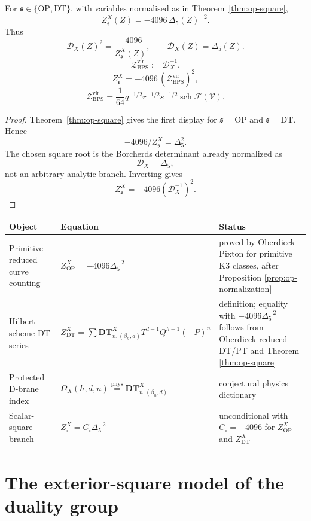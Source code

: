 \documentclass[11pt]{memoir}
\newcommand{\sch}{\operatorname{sch}}
\begin{document}
\begin{theorem}
For \(\mathfrak s\in\{\mathrm{OP},\mathrm{DT}\}\), with variables
normalised as in Theorem~\ref{thm:op-square},
$$Z^X_{\mathfrak s}(Z)=-4096\,\Delta_5(Z)^{-2}.$$
Thus
$$\mathcal{D}_X(Z)^2=\frac{-4096}{Z^X_{\mathfrak s}(Z)},
\qquad \mathcal D_X(Z)=\Delta_5(Z).$$
$$\mathcal Z_{\mathrm{BPS}}^{\mathrm{vir}}:=\mathcal D_X^{-1}.$$
$$Z^X_{\mathfrak s}
=-4096\,(\mathcal Z_{\mathrm{BPS}}^{\mathrm{vir}})^2,$$
$$\mathcal Z_{\mathrm{BPS}}^{\mathrm{vir}}
=\frac{1}{64}q^{-1/2}r^{-1/2}s^{-1/2}\sch\mathcal F(\mathcal V).$$
\end{theorem}

\begin{proof}
Theorem~\ref{thm:op-square} gives the first display for
\(\mathfrak s=\mathrm{OP}\) and \(\mathfrak s=\mathrm{DT}\).  Hence
$$-4096/Z^X_{\mathfrak s}=\Delta_5^2.$$
The chosen square root is the Borcherds determinant already normalized
as
$$\mathcal D_X=\Delta_5,$$
not an arbitrary analytic branch.  Inverting gives
$$Z^X_{\mathfrak s}=-4096(\mathcal D_X^{-1})^2.$$
\end{proof}

\begin{center}
\small
\begin{tabular}{>{\raggedright\arraybackslash}p{}
>{\raggedright\arraybackslash}p{}
>{\raggedright\arraybackslash}p{}}
\hline
Object & Equation & Status \\
\hline
Primitive reduced curve counting &
\(Z^X_{\mathrm{OP}}=-4096\Delta_5^{-2}\) &
proved by Oberdieck--Pixton for primitive K3 classes, after
Proposition \ref{prop:op-normalization} \\
Hilbert-scheme DT series &
\(Z^X_{\mathrm{DT}}=\sum\mathbf{DT}^X_{n,(\beta_h,d)}
T^{d-1}Q^{h-1}(-P)^n\) &
definition; equality with \(-4096\Delta_5^{-2}\) follows from
Oberdieck reduced DT/PT and Theorem \ref{thm:op-square} \\
Protected D-brane index &
\(\Omega_X(h,d,n)\stackrel{\mathrm{phys}}{=}
\mathbf{DT}^X_{n,(\beta_h,d)}\) &
conjectural physics dictionary \\
Scalar-square branch &
\(Z^X_{\square}=C_{\square}\Delta_5^{-2}\) &
unconditional with \(C_{\square}=-4096\) for
\(Z^X_{\mathrm{OP}}\) and \(Z^X_{\mathrm{DT}}\) \\
\hline
\end{tabular}
\end{center}

\section{The exterior-square model of the duality group}
\end{document}
